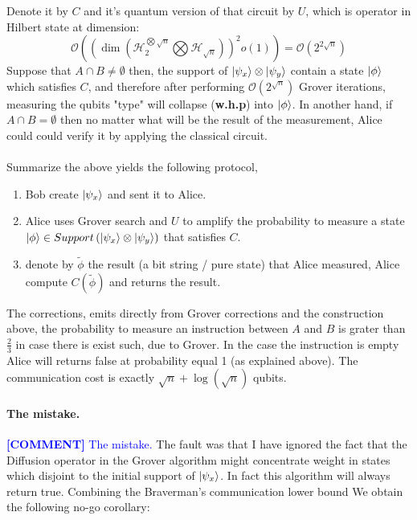 \documentclass{article}
\newcommand{\commentt}[1]{\textcolor{blue}{ \textbf{[COMMENT]} #1}}
\newcommand{\ctt}[1]{\commentt{#1}}
\newcommand{\onotation}[1]{\(\mathcal{O} \left( {#1}  \right) \)}
\newcommand{\ona}[1]{\onotation{#1}}
\begin{document}
Denote it by \( C \) and it's quantum version of that circuit by \( U \), which is operator in Hilbert state at dimension: \[ \mathcal{O} \left( \left( \dim \left( \mathcal{H}_{2}^{\bigotimes \sqrt{n}} \bigotimes \mathcal{H}_{\sqrt{n}} \right) \right) ^2 o(1) \right) = \mathcal{O} \left( 2^{2\sqrt{n}}  \right)  \]
Suppose that \( A \cap B \neq \emptyset \) then, the support of \( \ket{\psi_x} \otimes \ket{\psi_y} \) contain a state \( \ket{\phi} \) which satisfies \(C\), and therefore  after performing \ona{ 2^{ \sqrt{n}}} Grover iterations, measuring the qubits "type" will collapse (\textbf{w.h.p}) into \( \ket{\phi} \). In another hand, if \( A \cap B = \emptyset \) then no matter what will be the result of the measurement, Alice could could verify it by applying the classical circuit. 
\paragraph{}Summarize the above yields the following protocol,
\begin{enumerate}
    \item Bob create \( \ket{\psi_x} \) and sent it to Alice.
    \item Alice uses Grover search and \(U\) to amplify the probability to measure a state \( \ket{\phi} \in Support \left(   \ket{\psi_x} \otimes \ket{\psi_y}  \right) \) that satisfies \(C\).
    \item denote by \( \tilde{\phi} \) the result (a bit string / pure state) that Alice measured, Alice compute \(C\left(\tilde{\phi}\right) \) and returns the result. 
\end{enumerate}
The corrections, emits directly from Grover corrections and the construction above, the probability to measure an instruction between \(A\) and \(B\) is grater than \( \frac{2}{3} \) in case there is exist such, due to Grover. In the case the instruction is empty Alice will returns false at probability equal 1 (as explained above). The communication cost is exactly  \( \sqrt{n} + \log(\sqrt{n}) \) qubits. 


\paragraph{ The mistake.} \ctt{The mistake.} The fault was that I have ignored the fact that the Diffusion operator in the Grover algorithm might concentrate weight in states which disjoint to the initial support of \( \ket{\psi_{x}}\). In fact this algorithm will always return true. 
Combining the Braverman's communication  lower bound We obtain the following no-go corollary:
\end{document}
